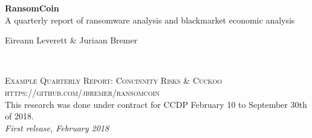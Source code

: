 \documentclass[11pt,fleqn]{book} %
\begin{document}

\begingroup
\thispagestyle{empty}
\centering
\vspace*{5cm}
\par\normalfont\fontsize{35}{35}\sffamily\selectfont
\textbf{RansomCoin}\\
{\LARGE A quarterly report of ransomware analysis and blackmarket economic analysis}\par %
\vspace*{1cm}
{\Huge Eireann Leverett \& Juriaan Bremer}\par %
\endgroup


\newpage
~\vfill
\thispagestyle{empty}


\noindent \textsc{Example Quarterly Report: Concinnity Risks \& Cuckoo}\\

\noindent \textsc{https://github.com/jbremer/ransomcoin}\\ %

\noindent This research was done under contract for CCDP February 10 to September 30th of 2018.\\ %

\noindent \textit{First release, February 2018} %



\pagestyle{empty} %

\tableofcontents %

\end{document}
